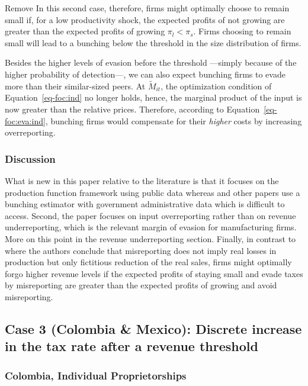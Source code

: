 \documentclass[
  12pt]{article}
\theoremstyle{definition}
\theoremstyle{remark}
\begin{document}
\begin{anfxnote}{Remove}
In this second case, therefore, firms might optimally choose to remain
small if, for a low productivity shock, the expected profits of not
growing are greater than the expected profits of growing
\(\pi_l<\pi_s\). Firms choosing to remain small will lead to a bunching
below the threshold in the size distribution of firms.

Besides the higher levels of evasion before the threshold ---simply
because of the higher probability of detection---, we can also expect
bunching firms to evade more than their similar-sized peers. At
\(\tilde{M}_{it}\), the optimization condition of
Equation~\ref{eq-foc:ind} no longer holds, hence, the marginal product
of the input is now greater than the relative prices. Therefore,
according to Equation~\ref{eq-foc:eva:ind}, bunching firms would
compensate for their \emph{higher} costs by increasing overreporting.

\subsubsection{Discussion}\label{discussion}

What is new in this paper relative to the literature is that it focuses
on the production function framework using public data whereas
\citet{Almunia2018} and other papers use a bunching estimator with
government administrative data which is difficult to access. Second, the
paper focuses on input overreporting rather than on revenue
underreporting, which is the relevant margin of evasion for
manufacturing firms. More on this point in the revenue underreporting
section. Finally, in contrast to \citet{Almunia2018} where the authors
conclude that misreporting does not imply real losses in production but
only fictitious reduction of the real sales, firms might optimally forgo
higher revenue levels if the expected profits of staying small and evade
taxes by misreporting are greater than the expected profits of growing
and avoid misreporting.

\subsection{Case 3 (Colombia \& Mexico): Discrete increase in the tax
rate after a revenue
threshold}\label{case-3-colombia-mexico-discrete-increase-in-the-tax-rate-after-a-revenue-threshold}

\subsubsection{Colombia, Individual
Proprietorships}\label{colombia-individual-proprietorships}


\end{anfxnote}
\end{document}
